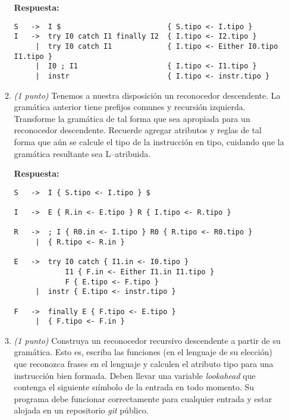\documentclass[a4paper,10pt]{article}
\begin{document}
\begin{enumerate}
\begin{enumerate}
            \textbf{Respuesta:}
            \begin{verbatim}
S   ->  I $                         { S.tipo <- I.tipo }  
I   ->  try I0 catch I1 finally I2  { I.tipo <- I2.tipo }
     |  try I0 catch I1             { I.tipo <- Either I0.tipo I1.tipo }
     |  I0 ; I1                     { I.tipo <- I1.tipo }
     |  instr                       { I.tipo <- instr.tipo }
            \end{verbatim}
            \newpage

            \item \textit{(1 punto)} Tenemos a nuestra disposici\'on un reconocedor descendente. 
            La gram\'atica anterior tiene prefijos comunes y recursi\'on izquierda. Transforme la 
            gram\'atica de tal forma que sea apropiada para un reconocedor descendente. Recuerde 
            agregar atributos y reglas de tal forma que a\'un se calcule el tipo de la instrucci\'on
            en tipo, cuidando que la gram\'atica resultante sea L–atribuida.
            
            \textbf{Respuesta:} 

            \begin{verbatim}
S   ->  I { S.tipo <- I.tipo } $  

I   ->  E { R.in <- E.tipo } R { I.tipo <- R.tipo }   

R   ->  ; I { R0.in <- I.tipo } R0 { R.tipo <- R0.tipo }
     |  { R.tipo <- R.in }

E   ->  try I0 catch { I1.in <- I0.tipo } 
            I1 { F.in <- Either I1.in I1.tipo } 
            F { E.tipo <- F.tipo }   
     |  instr { E.tipo <- instr.tipo } 
     
F   ->  finally E { F.tipo <- E.tipo }       
     |  { F.tipo <- F.in }
            \end{verbatim}
            \vspace*{1cm}
        
            \item \textit{(1 punto)} Construya un reconocedor recursivo descendente a partir 
            de su gram\'atica. Esto es, escriba las funciones (en el lenguaje de su elección) 
            que reconozca frases en el lenguaje y calculen el atributo tipo para una instrucci\'on 
            bien formada. Deben llevar una variable \textit{lookahead} que contenga el siguiente 
            sı\'imbolo de la entrada en todo momento. Su programa debe funcionar correctamente 
            para cualquier entrada y estar alojada en un repositorio \textit{git} p\'ublico. \\


\end{enumerate}
\end{enumerate}
\end{document}
